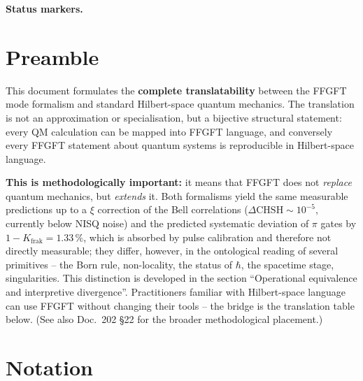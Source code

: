 
\medskip\noindent\textbf{Status markers.}


\section*{Preamble}

This document formulates the \textbf{complete translatability} between
the FFGFT mode formalism and standard Hilbert-space quantum mechanics.
The translation is not an approximation or specialisation, but a
bijective structural statement: every QM calculation can be mapped
into FFGFT language, and conversely every FFGFT statement about
quantum systems is reproducible in Hilbert-space language.

\textbf{This is methodologically important:} it means that FFGFT does
not \emph{replace} quantum mechanics, but \emph{extends} it. Both
formalisms yield the same measurable predictions up to a $\xi$
correction of the Bell correlations ($\Delta\text{CHSH} \sim 10^{-5}$,
currently below NISQ noise) and the predicted systematic deviation of
$\pi$ gates by $1 - K_{\text{frak}} = 1.33\,\%$, which is absorbed by
pulse calibration and therefore not directly measurable; they differ,
however, in the ontological reading of several primitives -- the Born
rule, non-locality, the status of $\hbar$, the spacetime stage,
singularities. This distinction is developed in the section
``Operational equivalence and interpretive divergence''.
Practitioners familiar with Hilbert-space language can use FFGFT
without changing their tools -- the bridge is the translation table
below. (See also Doc.~202 §22 for the broader methodological
placement.)

\section*{Notation}

